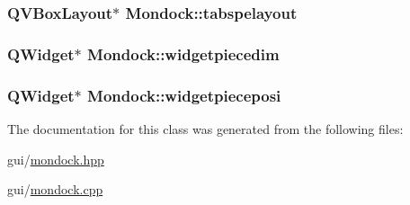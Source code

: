 \hypertarget{class_mondock_af59762fb339ae8c0821fada75433e8fb}{
\subsubsection[{tabspelayout}]{\setlength{\rightskip}{0pt plus 5cm}Q\+V\+Box\+Layout$\ast$ Mondock\+::tabspelayout\hspace{0.3cm}{\ttfamily [private]}}}\label{class_mondock_af59762fb339ae8c0821fada75433e8fb}
\hypertarget{class_mondock_abe21ad30be63590c6ce6e18969e9f082}{
\subsubsection[{widgetpiecedim}]{\setlength{\rightskip}{0pt plus 5cm}Q\+Widget$\ast$ Mondock\+::widgetpiecedim\hspace{0.3cm}{\ttfamily [private]}}}\label{class_mondock_abe21ad30be63590c6ce6e18969e9f082}
\hypertarget{class_mondock_a960802e2aa94a22487ff03bbaa102a02}{
\subsubsection[{widgetpieceposi}]{\setlength{\rightskip}{0pt plus 5cm}Q\+Widget$\ast$ Mondock\+::widgetpieceposi\hspace{0.3cm}{\ttfamily [private]}}}\label{class_mondock_a960802e2aa94a22487ff03bbaa102a02}


The documentation for this class was generated from the following files\+:\begin{DoxyCompactItemize}
\item 
gui/\hyperlink{mondock_8hpp}{mondock.\+hpp}\item 
gui/\hyperlink{mondock_8cpp}{mondock.\+cpp}\end{DoxyCompactItemize}
